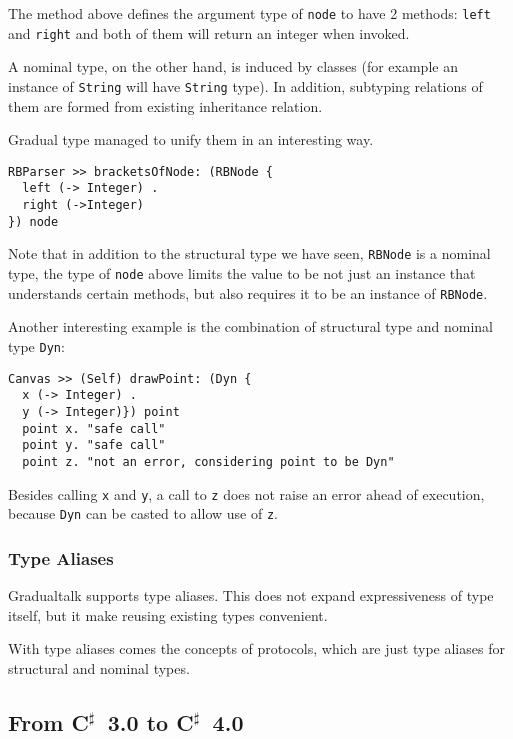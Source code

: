 The method above defines the argument type of \texttt{node} to have 2 methods:
\texttt{left} and \texttt{right} and both of them will return an integer when invoked.

A nominal type, on the other hand, is induced by classes
(for example an instance of \texttt{String} will have \texttt{String} type).
In addition, subtyping relations of them are formed from existing inheritance relation.

Gradual type managed to unify them in an interesting way.

\begin{verbatim}
RBParser >> bracketsOfNode: (RBNode {
  left (-> Integer) .
  right (->Integer)
}) node
\end{verbatim}

Note that in addition to the structural type we have seen,
\texttt{RBNode} is a nominal type, the type of \texttt{node} above
limits the value to be not just an instance that understands certain methods,
but also requires it to be an instance of \texttt{RBNode}.

Another interesting example is the combination of structural type
and nominal type \texttt{Dyn}:

\begin{verbatim}
Canvas >> (Self) drawPoint: (Dyn {
  x (-> Integer) .
  y (-> Integer)}) point
  point x. "safe call"
  point y. "safe call"
  point z. "not an error, considering point to be Dyn"
\end{verbatim}

Besides calling \texttt{x} and \texttt{y}, a call to \texttt{z} does not
raise an error ahead of execution, because \texttt{Dyn} can be casted to allow use of
\texttt{z}.

\subsubsection{Type Aliases}

Gradualtalk supports type aliases. This does not expand expressiveness of type itself,
but it make reusing existing types convenient.

With type aliases comes the concepts of protocols, which are just type aliases
for structural and nominal types.

\newcommand{\csharp}{C$^\sharp$}
\subsection{From \csharp\ 3.0 to \csharp\ 4.0}

